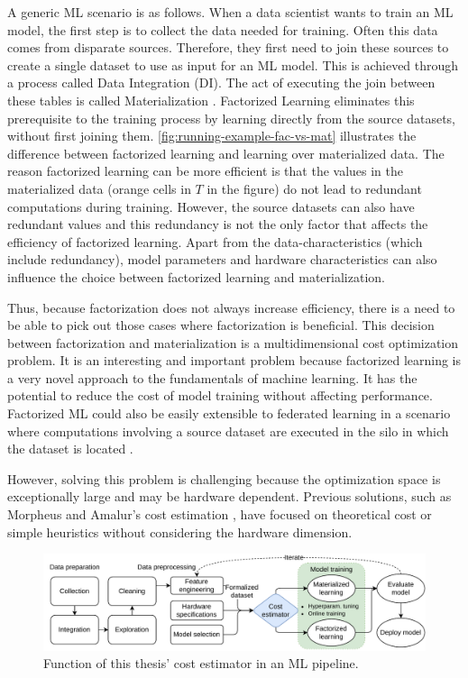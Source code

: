 A generic ML scenario is as follows. When a data scientist wants to train an ML model, the first step is to collect the data needed for training. Often this data comes from disparate sources. Therefore, they first need to join these sources to create a single dataset to use as input for an ML model. This is achieved through a process called Data Integration (DI). The act of executing the join between these tables is called Materialization \cite{rel_db_glossary}. Factorized Learning eliminates this prerequisite to the training process by learning directly from the source datasets, without first joining them. \autoref{fig:running-example-fac-vs-mat} illustrates the difference between factorized learning and learning over materialized data. The reason factorized learning can be more efficient is that the values in the materialized data (orange cells in $T$ in the figure) do not lead to redundant computations during training. However, the source datasets can also have redundant values and this redundancy is not the only factor that affects the efficiency of factorized learning. Apart from the data-characteristics (which include redundancy), model parameters and hardware characteristics can also influence the choice between factorized learning and materialization.

Thus, because factorization does not always increase efficiency, there is a need to be able to pick out those cases where factorization is beneficial. This decision between factorization and materialization is a multidimensional cost optimization problem. It is an interesting and important problem because factorized learning is a very novel approach to the fundamentals of machine learning. It has the potential to reduce the cost of model training without affecting performance. Factorized ML could also be easily extensible to federated learning in a scenario where computations involving a source dataset are executed in the silo in which the dataset is located \cite{amalur}.

However, solving this problem is challenging because the optimization space is exceptionally large and may be hardware dependent. Previous solutions, such as Morpheus \cite{morpheus} and Amalur's cost estimation \cite{schijndel_cost_estimation}, have focused on theoretical cost or simple heuristics without considering the hardware dimension.

\begin{figure}[h]
    \centering
    \includegraphics[width=0.95\linewidth]{chapters/01_introduction/figures/ML-Pipeline.pdf}
    \caption{Function of this thesis' cost estimator in an ML pipeline.}
    \label{fig:ml-pipeline}
\end{figure}

